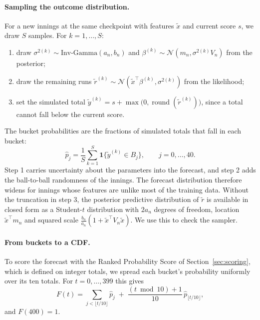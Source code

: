 \documentclass{article}
\newcommand{\1}{\mathbf{1}}
\begin{document}
\paragraph{Sampling the outcome distribution.} For a new innings at the same checkpoint with features $\tilde x$ and current score $s$, we draw $S$ samples. For $k = 1, \dots, S$:
\begin{enumerate}
\item draw $\sigma^{2(k)} \sim \text{Inv-Gamma}(a_n, b_n)$ and $\beta^{(k)} \sim \mathcal{N}(m_n, \sigma^{2(k)} V_n)$ from the posterior;
\item draw the remaining runs $\tilde r^{(k)} \sim \mathcal{N}(\tilde x^\top \beta^{(k)}, \sigma^{2(k)})$ from the likelihood;
\item set the simulated total $\tilde y^{(k)} = s + \max\big(0, \operatorname{round}(\tilde r^{(k)})\big)$, since a total cannot fall below the current score.
\end{enumerate}
The bucket probabilities are the fractions of simulated totals that fall in each bucket:
\begin{equation}
\hat p_j = \frac{1}{S} \sum_{k=1}^{S} \1\{\tilde y^{(k)} \in B_j\}, \qquad j = 0, \dots, 40.
\end{equation}
Step 1 carries uncertainty about the parameters into the forecast, and step 2 adds the ball-to-ball randomness of the innings. The forecast distribution therefore widens for innings whose features are unlike most of the training data. Without the truncation in step 3, the posterior predictive distribution of $\tilde r$ is available in closed form as a Student-$t$ distribution with $2a_n$ degrees of freedom, location $\tilde x^\top m_n$ and squared scale $\tfrac{b_n}{a_n}(1 + \tilde x^\top V_n \tilde x)$. We use this to check the sampler.

\paragraph{From buckets to a CDF.} To score the forecast with the Ranked Probability Score of Section~\ref{sec:scoring}, which is defined on integer totals, we spread each bucket's probability uniformly over its ten totals. For $t = 0, \dots, 399$ this gives
\begin{equation}\label{eq:bucketcdf}
F(t) = \sum_{j < \lfloor t/10 \rfloor} \hat p_j \;+\; \frac{(t \bmod 10) + 1}{10}\, \hat p_{\lfloor t/10 \rfloor},
\end{equation}
and $F(400) = 1$.
\end{document}
